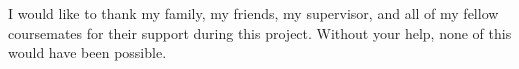 \noindent I would like to thank my family, my friends, my supervisor, and all of my fellow coursemates for their
support during this project. Without your help, none of this would have been possible.
